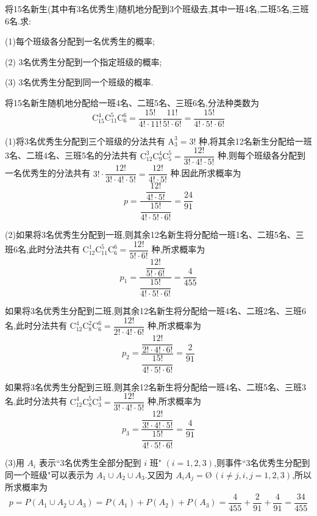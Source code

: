 \question 将15名新生(其中有3名优秀生)随机地分配到3个班级去,其中一班4名,二班5名,三班6名.求:

(1)每个班级各分配到一名优秀生的概率;

(2) 3名优秀生分配到一个指定班级的概率;

(3) 3名优秀生分配到同一个班级的概率.

\begin{solution}
    将15名新生随机地分配给一班4名、二班5名、三班6名,分法种类数为
    $$
    \mathrm{C}_{15}^4 \mathrm{C}_{11}^5 \mathrm{C}_6^6 = \dfrac{15!}{4! \cdot 11!} \dfrac{11!}{5! \cdot 6!} = \dfrac{15!}{4! \cdot 5! \cdot 6!}
    $$

    (1)将3名优秀生分配到三个班级的分法共有 $\mathrm{A}_3^3 = 3!$ 种,将其余12名新生分配给一班3名、二班4名、三班5名的分法共有 $\mathrm{C}_{12}^3 \mathrm{C}_9^4 \mathrm{C}_5^5 = \dfrac{12!}{3! \cdot 4! \cdot 5!}$ 种,则每个班级各分配到一名优秀生的分法共有 $3! \cdot \dfrac{12!}{3! \cdot 4! \cdot 5!} = \dfrac{12!}{4! \cdot 5!}$ 种.因此所求概率为
    $$
    p = \dfrac{\dfrac{12!}{4! \cdot 5!}}{\dfrac{15!}{4! \cdot 5! \cdot 6!}} = \dfrac{24}{91}
    $$

    (2)如果将3名优秀生分配到一班,则其余12名新生将分配给一班1名、二班5名、三班6名,此时分法共有 $\mathrm{C}_{12}^1 \mathrm{C}_{11}^5 \mathrm{C}_6^6 = \dfrac{12!}{5! \cdot 6!}$ 种,所求概率为
    $$
    p_1 = \dfrac{\dfrac{12!}{5! \cdot 6!}}{\dfrac{15!}{4! \cdot 5! \cdot 6!}} = \dfrac{4}{455}
    $$

    如果将3名优秀生分配到二班,则其余12名新生将分配给一班4名、二班2名、三班6名,此时分法共有 $\mathrm{C}_{12}^4 \mathrm{C}_{8}^2 \mathrm{C}_6^6 = \dfrac{12!}{2! \cdot 4! \cdot 6!}$ 种,所求概率为
    $$
    p_2 = \dfrac{\dfrac{12!}{2! \cdot 4! \cdot 6!}}{\dfrac{15!}{4! \cdot 5! \cdot 6!}} = \dfrac{2}{91}
    $$

    如果将3名优秀生分配到三班,则其余12名新生将分配给一班4名、二班5名、三班3名,此时分法共有 $\mathrm{C}_{12}^4 \mathrm{C}_{8}^5 \mathrm{C}_3^3 = \dfrac{12!}{3! \cdot 4! \cdot 5!}$ 种,所求概率为
    $$
    p_3 = \dfrac{\dfrac{12!}{3! \cdot 4! \cdot 5!}}{\dfrac{15!}{4! \cdot 5! \cdot 6!}} = \dfrac{4}{91}
    $$

    (3)用 $A_i$ 表示``3名优秀生全部分配到 $i$ 班" $(i=1,2,3)$,则事件``3名优秀生分配到同一个班级"可以表示为 $A_1 \cup A_2 \cup A_3$.又因为 $A_i A_j = \text{\O} \, (i \not= j, i,j=1,2,3)$,所以所求概率为
    $$
    p = P(A_1 \cup A_2 \cup A_3) = P(A_1) + P(A_2) + P(A_3) = \dfrac{4}{455} + \dfrac{2}{91} + \dfrac{4}{91} = \dfrac{34}{455}
    $$
\end{solution}

